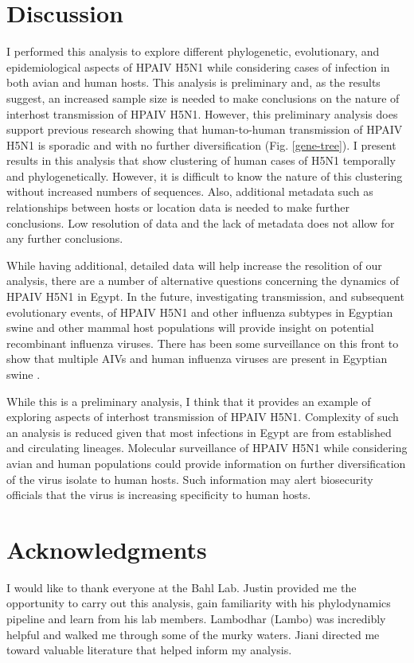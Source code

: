 \documentclass[10pt,english]{article}
\begin{document}
\section*{Discussion}

I performed this analysis to explore different phylogenetic, evolutionary, and epidemiological aspects of HPAIV H5N1 while considering cases of infection in both avian and human hosts. This analysis is preliminary and, as the results suggest, an increased sample size is needed to make conclusions on the nature of interhost transmission of HPAIV H5N1. However, this preliminary analysis does support previous research showing that human-to-human transmission of HPAIV H5N1 is sporadic and with no further diversification (Fig. \ref{gene-tree}). I present results in this analysis that show clustering of human cases of H5N1 temporally and phylogenetically. However, it is difficult to know the nature of this clustering without increased numbers of sequences. Also, additional metadata such as relationships between hosts or location data is needed to make further conclusions. Low resolution of data and the lack of metadata does not allow for any further conclusions.

While having additional, detailed data will help increase the resolition of our analysis, there are a number of alternative questions concerning the dynamics of HPAIV H5N1 in Egypt. In the future, investigating transmission, and subsequent evolutionary events, of HPAIV H5N1 and other influenza subtypes in Egyptian swine and other mammal host populations will provide insight on potential recombinant influenza viruses. There has been some surveillance on this front to show that multiple AIVs and human influenza viruses are present in Egyptian swine \autocite{Gomaa2018}.

While this is a preliminary analysis, I think that it provides an example of exploring aspects of interhost transmission of HPAIV H5N1. Complexity of such an analysis is reduced given that most infections in Egypt are from established and circulating lineages. Molecular surveillance of HPAIV H5N1 while considering avian and human populations could provide information on further diversification of the virus isolate to human hosts. Such information may alert biosecurity officials that the virus is increasing specificity to human hosts. 

\section*{Acknowledgments}

I would like to thank everyone at the Bahl Lab. Justin provided me the opportunity to carry out this analysis, gain familiarity with his phylodynamics pipeline and learn from his lab members. Lambodhar (Lambo) was incredibly helpful and walked me through some of the murky waters. Jiani directed me toward valuable literature that helped inform my analysis.  

\clearpage
\printbibliography
\end{document}
